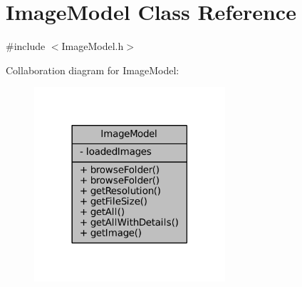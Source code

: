 \hypertarget{classImageModel}{}\section{Image\+Model Class Reference}
\label{classImageModel}


{\ttfamily \#include $<$Image\+Model.\+h$>$}



Collaboration diagram for Image\+Model\+:
\nopagebreak
\begin{figure}[H]
\begin{center}
\leavevmode
\includegraphics[width=201pt]{classImageModel__coll__graph}
\end{center}
\end{figure}
